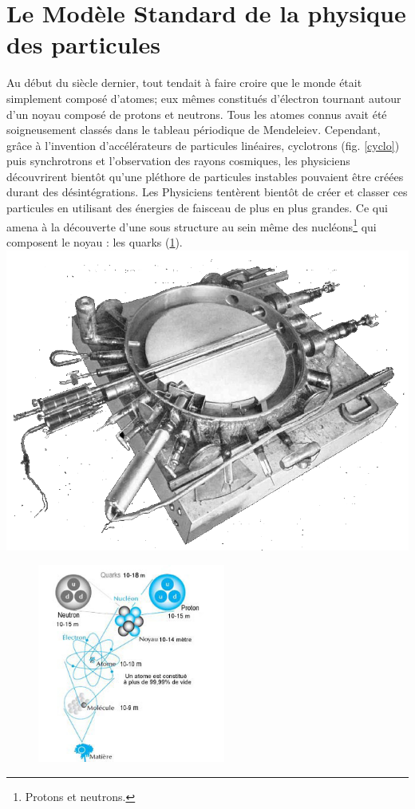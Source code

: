 \section{Le Modèle Standard de la physique des particules}
 
Au début du siècle dernier, tout tendait à faire croire que le monde était simplement composé d'atomes; eux mêmes constitués d'électron tournant autour d'un noyau composé de protons et neutrons. Tous les atomes connus avait été soigneusement classés dans le tableau périodique de Mendeleiev. Cependant, grâce à l'invention d'accélérateurs de particules linéaires, cyclotrons (fig. \ref{cyclo}) puis synchrotrons et l'observation des rayons cosmiques, les physiciens découvrirent bientôt qu'une pléthore de particules instables pouvaient être créées durant des désintégrations. Les Physiciens tentèrent bientôt de créer et classer ces particules en utilisant des énergies de faisceau de plus en plus grandes. Ce qui amena à la découverte d'une sous structure au sein même des nucléons\footnote{Protons et neutrons.} qui composent le noyau : les quarks (\ref{structure}).
\marginpar
{
	\includegraphics[width=\marginparwidth]{SM/cyclotron.png}
    	\label{cyclo}
}
\begin{figure}[h!]
\centering
\includegraphics[width=0.55\textwidth]{SM/structure.jpg}
\label{structure}
\end{figure}

